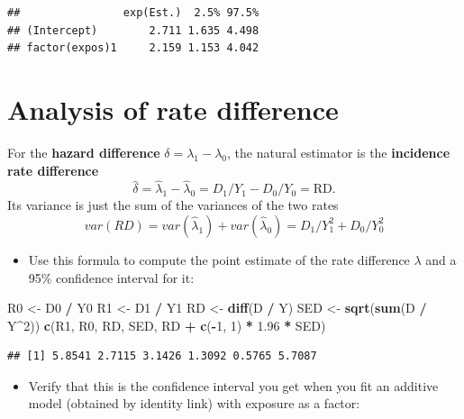\documentclass[
]{book}
\newenvironment{Shaded}{\begin{snugshade}}{\end{snugshade}}
\newcommand{\DecValTok}[1]{\textcolor[rgb]{0.00,0.00,0.81}{#1}}
\newcommand{\FloatTok}[1]{\textcolor[rgb]{0.00,0.00,0.81}{#1}}
\newcommand{\FunctionTok}[1]{\textcolor[rgb]{0.13,0.29,0.53}{\textbf{#1}}}
\newcommand{\NormalTok}[1]{#1}
\newcommand{\OtherTok}[1]{\textcolor[rgb]{0.56,0.35,0.01}{#1}}
\newcommand{\SpecialCharTok}[1]{\textcolor[rgb]{0.81,0.36,0.00}{\textbf{#1}}}
\providecommand{\tightlist}{%
  \setlength{\itemsep}{0pt}\setlength{\parskip}{0pt}}
\theoremstyle{definition}
\theoremstyle{definition}
\theoremstyle{definition}
\theoremstyle{definition}
\theoremstyle{remark}
\begin{document}
\begin{verbatim}
##                exp(Est.)  2.5% 97.5%
## (Intercept)        2.711 1.635 4.498
## factor(expos)1     2.159 1.153 4.042
\end{verbatim}

\section{Analysis of rate difference}\label{analysis-of-rate-difference}

For the \textbf{hazard difference} \(\delta = \lambda_1 - \lambda_0\),
the natural estimator is the \textbf{incidence rate difference}
\[ \widehat\delta = \widehat\lambda_1  - \widehat\lambda_0 = D_1/Y_1 - D_0/Y_0 = \mbox{RD} . \]
Its variance is just the sum of the variances of the two rates
\[ var(RD) = var(\widehat\lambda_1 ) + var( \widehat\lambda_0 ) =  D_1/Y_1^2 + D_0/Y_0^2 \]

\begin{itemize}
\tightlist
\item
  Use this formula to compute the point estimate of the rate difference \(\lambda\) and a 95\% confidence interval for it:
\end{itemize}

\begin{Shaded}
\begin{Highlighting}[]
\NormalTok{R0 }\OtherTok{\textless{}{-}}\NormalTok{ D0 }\SpecialCharTok{/}\NormalTok{ Y0}
\NormalTok{R1 }\OtherTok{\textless{}{-}}\NormalTok{ D1 }\SpecialCharTok{/}\NormalTok{ Y1}
\NormalTok{RD }\OtherTok{\textless{}{-}} \FunctionTok{diff}\NormalTok{(D }\SpecialCharTok{/}\NormalTok{ Y)}
\NormalTok{SED }\OtherTok{\textless{}{-}} \FunctionTok{sqrt}\NormalTok{(}\FunctionTok{sum}\NormalTok{(D }\SpecialCharTok{/}\NormalTok{ Y}\SpecialCharTok{\^{}}\DecValTok{2}\NormalTok{))}
\FunctionTok{c}\NormalTok{(R1, R0, RD, SED, RD }\SpecialCharTok{+} \FunctionTok{c}\NormalTok{(}\SpecialCharTok{{-}}\DecValTok{1}\NormalTok{, }\DecValTok{1}\NormalTok{) }\SpecialCharTok{*} \FloatTok{1.96} \SpecialCharTok{*}\NormalTok{ SED)}
\end{Highlighting}
\end{Shaded}

\begin{verbatim}
## [1] 5.8541 2.7115 3.1426 1.3092 0.5765 5.7087
\end{verbatim}

\begin{itemize}
\tightlist
\item
  Verify that this is the confidence interval you get when you fit
  an additive model (obtained by identity link) with exposure as a factor:
\end{itemize}
\end{document}
